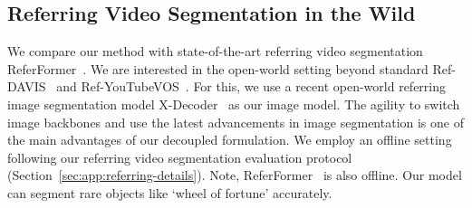 \subsection{Referring Video Segmentation in the Wild}
We compare our method with state-of-the-art referring video segmentation ReferFormer~\cite{wu2022language}.
We are interested in the open-world setting beyond standard Ref-DAVIS~\cite{khoreva2019video} and Ref-YouTubeVOS~\cite{seo2020urvos}. 
For this, we use a recent open-world referring image segmentation model X-Decoder~\cite{zou2022generalized} as our image model. 
The agility to switch image backbones and use the latest advancements in image segmentation is one of the main advantages of our decoupled formulation. 
We employ an offline setting following our referring video segmentation evaluation protocol (Section~\ref{sec:app:referring-details}). 
Note, ReferFormer~\cite{wu2022language} is also offline.
Our model can segment rare objects like `wheel of fortune' accurately.

%
